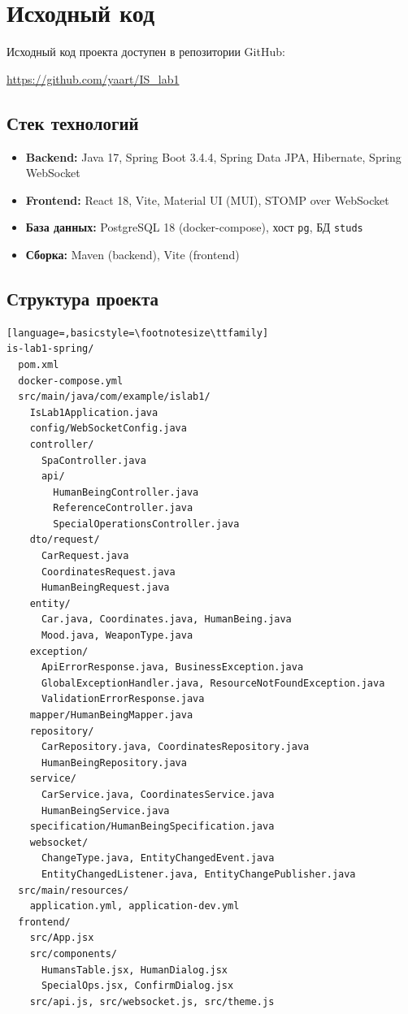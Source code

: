 \documentclass[14pt,a4paper]{extarticle}
\begin{document}
\section{Исходный код}

Исходный код проекта доступен в репозитории GitHub:

\url{https://github.com/yaart/IS_lab1}

\subsection{Стек технологий}
\begin{itemize}
    \item \textbf{Backend:} Java 17, Spring Boot 3.4.4, Spring Data JPA, Hibernate, Spring WebSocket
    \item \textbf{Frontend:} React 18, Vite, Material UI (MUI), STOMP over WebSocket
    \item \textbf{База данных:} PostgreSQL 18 (docker-compose), хост \texttt{pg}, БД \texttt{studs}
    \item \textbf{Сборка:} Maven (backend), Vite (frontend)
\end{itemize}

\subsection{Структура проекта}
\begin{lstlisting}[language=,basicstyle=\footnotesize\ttfamily]
is-lab1-spring/
  pom.xml
  docker-compose.yml
  src/main/java/com/example/islab1/
    IsLab1Application.java
    config/WebSocketConfig.java
    controller/
      SpaController.java
      api/
        HumanBeingController.java
        ReferenceController.java
        SpecialOperationsController.java
    dto/request/
      CarRequest.java
      CoordinatesRequest.java
      HumanBeingRequest.java
    entity/
      Car.java, Coordinates.java, HumanBeing.java
      Mood.java, WeaponType.java
    exception/
      ApiErrorResponse.java, BusinessException.java
      GlobalExceptionHandler.java, ResourceNotFoundException.java
      ValidationErrorResponse.java
    mapper/HumanBeingMapper.java
    repository/
      CarRepository.java, CoordinatesRepository.java
      HumanBeingRepository.java
    service/
      CarService.java, CoordinatesService.java
      HumanBeingService.java
    specification/HumanBeingSpecification.java
    websocket/
      ChangeType.java, EntityChangedEvent.java
      EntityChangedListener.java, EntityChangePublisher.java
  src/main/resources/
    application.yml, application-dev.yml
  frontend/
    src/App.jsx
    src/components/
      HumansTable.jsx, HumanDialog.jsx
      SpecialOps.jsx, ConfirmDialog.jsx
    src/api.js, src/websocket.js, src/theme.js
\end{lstlisting}
\end{document}
